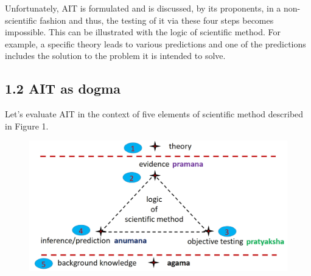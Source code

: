 Unfortunately, AIT is formulated and is discussed, by its proponents, in a non-scientific fashion and thus, the testing of it via these four steps becomes impossible. This can be illustrated with the logic of scientific method. For example, a specific theory leads to various predictions and one of the predictions includes the solution to the problem it is intended to solve.


\subsection*{1.2 AIT as dogma}

Let’s evaluate AIT in the context of five elements of scientific method described in Figure 1.

\begin{figure}[!htbp]
\includegraphics[scale=0.2]{images/8-01.jpg}
\caption{}\label{art8-fig01}
\end{figure}

